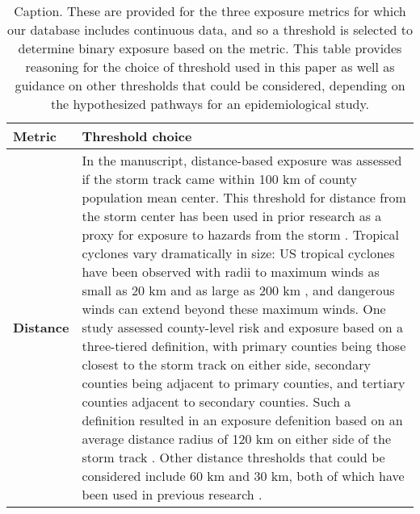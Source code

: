 \begin{table}
\caption{Caption. These are provided for the three exposure metrics for which our database includes continuous data, and so a threshold is selected to determine binary exposure based on the metric. This table provides reasoning for the choice of threshold used in this paper as well as guidance on other thresholds that could be considered, depending on the hypothesized pathways for an epidemiological study.}
\label{tab:thresholds}
\centering
\begin{tabular}{>{\bfseries\leavevmode\color{black}}l>{\raggedright\arraybackslash}p{40em}}
\toprule
Metric & Threshold choice\\
\midrule
Distance & In the manuscript, distance-based exposure was assessed if the storm track came within 100 km of county population mean center. This threshold for distance from the storm center has been used in prior research as a proxy for exposure to hazards from the storm \cite{grabich2015measuring}. Tropical cyclones vary dramatically in size: US tropical cyclones have been observed with radii to maximum winds as small as 20 km and as large as 200 km \cite{mallin2006, quiring2011variations}, and dangerous winds can extend beyond these maximum winds. One study \cite{czajkowski2011} assessed county-level risk and exposure based on a three-tiered definition, with primary counties being those closest to the storm track on either side, secondary counties being adjacent to primary counties, and tertiary counties adjacent to secondary counties. Such a definition resulted in an exposure defenition based on an average distance radius of 120 km on either side of the storm track \cite{czajkowski2011}. Other distance thresholds that could be considered include 60 km and 30 km, both of which have been used in previous research \cite{grabich2015measuring, grabich2015, currie2013}.\\

\end{tabular}
\end{table}
